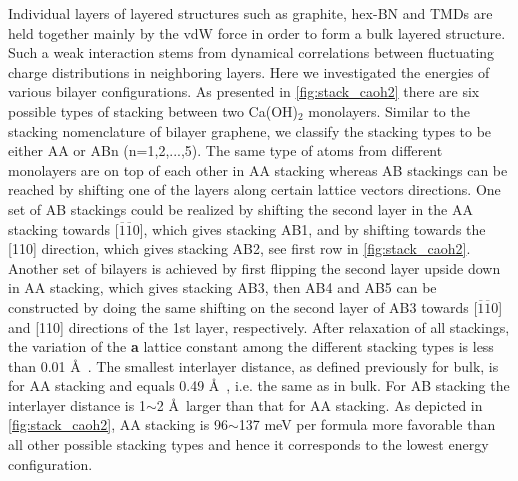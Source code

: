 Individual layers of layered structures such as graphite, hex-BN and TMDs 
are held together mainly by the vdW force in order to form a bulk 
layered structure. Such a weak interaction stems from dynamical correlations 
between 
fluctuating charge distributions in neighboring layers. Here we 
investigated the energies of various bilayer configurations. As presented
in \autoref{fig:stack_caoh2} there are six possible types of stacking between two 
Ca(OH)$_2$ monolayers. Similar to the stacking nomenclature of bilayer graphene, 
we classify the stacking types to be either AA or ABn (n=1,2,...,5). The 
same type of atoms from different monolayers are on top of each other in AA 
stacking whereas AB stackings can be reached by shifting one of the layers along 
certain lattice vectors directions. One set of AB stackings could be realized by shifting 
the second layer in the AA stacking towards [$\overline{1}\overline{1}0$], 
which gives stacking AB1, and by shifting towards the [110] direction, which 
gives stacking AB2, see first row in \autoref{fig:stack_caoh2}. Another set of 
bilayers is achieved by first flipping the second layer upside down in AA 
stacking, which gives stacking AB3, then AB4 and AB5 can be constructed by doing the 
same shifting on the second layer of AB3 towards [$\overline{1}\overline{1}0$] 
and [110] directions of the 1st layer, respectively. After relaxation of all 
stackings, the variation of the \textbf{a} lattice constant among the different 
stacking types is less than 0.01 \AA~. The smallest interlayer
distance, as defined previously for bulk, is for AA stacking and equals
0.49 \AA~, i.e. the same as in bulk. For AB
stacking the interlayer distance is 1$\sim$2 \AA ~larger than that for AA
stacking. As depicted in \autoref{fig:stack_caoh2}, AA stacking is 96$\sim$137 meV
per formula more favorable than all other possible stacking types and hence it
corresponds to the lowest energy configuration. 

